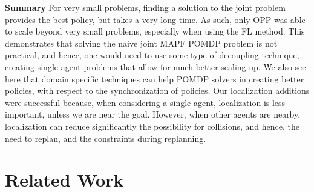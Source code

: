 \documentclass[letterpaper]{article} %
\begin{document}
\noindent\textbf{Summary} For very small problems, finding a solution to the joint problem provides the best policy, but takes a very long time. As such, only OPP was able to scale beyond very small problems, especially when using the FL method. This demonstrates that solving the naive joint MAPF POMDP problem is not practical, and hence, one would need to use some type of decoupling technique, creating single agent problems that allow for much better scaling up.  We also see here that domain specific techniques can help POMDP solvers in creating better policies, with respect to the synchronization of policies. Our localization additions were successful because, when considering a single agent, localization is less important, unless we are near the goal. However, when other agents are nearby, localization can reduce significantly the possibility for collisions, and hence, the need to replan, and the constraints during replanning.




\vspace{-3.02mm}
\section{Related Work}
\end{document}
